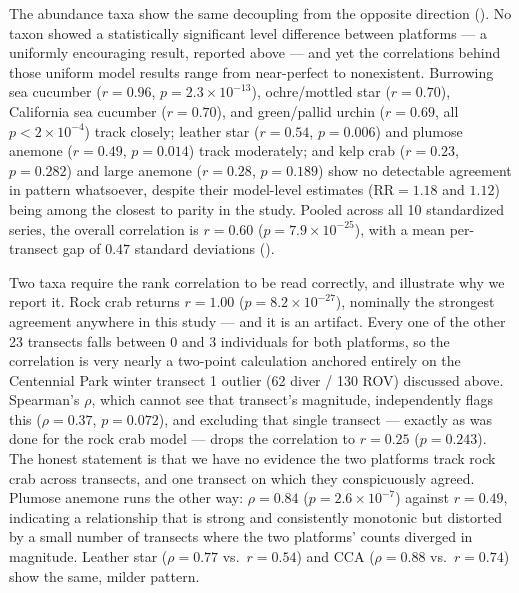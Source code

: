 \documentclass[11pt]{article}
\begin{document}
The abundance taxa show the same decoupling from the opposite direction
().
No taxon showed a statistically significant level difference between platforms
--- a uniformly encouraging result, reported above --- and yet the
correlations behind those uniform model results range from near-perfect to
nonexistent.
Burrowing sea cucumber ($r=0.96$, $p=2.3\times10^{-13}$), ochre/mottled star
($r=0.70$), California sea cucumber ($r=0.70$), and green/pallid urchin
($r=0.69$, all $p<2\times10^{-4}$) track closely; leather star ($r=0.54$,
$p=0.006$) and plumose anemone ($r=0.49$, $p=0.014$) track moderately; and
kelp crab ($r=0.23$, $p=0.282$) and large anemone ($r=0.28$, $p=0.189$) show
no detectable agreement in pattern whatsoever, despite their model-level
estimates ($\mathrm{RR}=1.18$ and $1.12$) being among the closest to parity in
the study.
Pooled across all 10 standardized series, the overall correlation is $r=0.60$
($p=7.9\times10^{-25}$), with a mean per-transect gap of $0.47$ standard
deviations ().

Two taxa require the rank correlation to be read correctly, and illustrate why
we report it.
Rock crab returns $r=1.00$ ($p=8.2\times10^{-27}$), nominally the strongest
agreement anywhere in this study --- and it is an artifact.
Every one of the other 23 transects falls between 0 and 3 individuals for both
platforms, so the correlation is very nearly a two-point calculation anchored
entirely on the Centennial Park winter transect 1 outlier (62 diver / 130 ROV)
discussed above.
Spearman's $\rho$, which cannot see that transect's magnitude, independently
flags this ($\rho=0.37$, $p=0.072$), and excluding that single transect ---
exactly as was done for the rock crab model --- drops the correlation to
$r=0.25$ ($p=0.243$).
The honest statement is that we have no evidence the two platforms track rock
crab across transects, and one transect on which they conspicuously agreed.
Plumose anemone runs the other way: $\rho=0.84$ ($p=2.6\times10^{-7}$) against
$r=0.49$, indicating a relationship that is strong and consistently monotonic
but distorted by a small number of transects where the two platforms' counts
diverged in magnitude.
Leather star ($\rho=0.77$ vs.\ $r=0.54$) and CCA ($\rho=0.88$ vs.\ $r=0.74$)
show the same, milder pattern.
\end{document}
